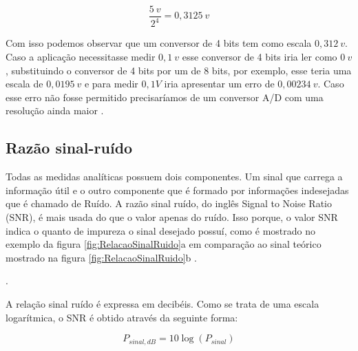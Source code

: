 \begin{equation}
    \frac{5 \ v}{2^4}=0,3125 \ v
\end{equation}

Com isso podemos observar que um conversor de 4 bits tem como escala $0,312 \ v$. Caso a aplicação necessitasse medir $0,1 \ v$ esse conversor de 4 bits iria ler como $0 \ v$, substituindo o conversor de 4 bits por um de 8 bits, por exemplo, esse teria uma escala de $0,0195 \ v$ e para medir $0,1V$ iria apresentar um erro de $0,00234 \ v$. Caso esse erro não fosse permitido precisaríamos de um conversor A/D com uma resolução ainda maior \cite{Lathi2018}. 









\newpage

\subsection{Razão sinal-ruído}

Todas as medidas analíticas possuem dois componentes. Um sinal que carrega a informação útil e o outro componente que é formado por informações indesejadas que é chamado de Ruído. A razão sinal ruído, do inglês Signal to Noise Ratio (SNR), é mais usada do que o valor apenas do ruído. Isso porque, o valor SNR indica o quanto de impureza o sinal desejado possuí, como é mostrado no exemplo da figura \ref{fig:RelacaoSinalRuido}a em comparação ao sinal teórico mostrado na figura \ref{fig:RelacaoSinalRuido}b \cite[p.~98]{principioAnaliseInstrumental}.






 .
 
 

 
 



A relação sinal ruído é expressa em decibéis. Como se trata de uma escala logarítmica, o SNR é obtido através da seguinte forma: 


\begin{equation}
    P_{sinal,dB}=10 \log(P_{sinal})
\end{equation}



